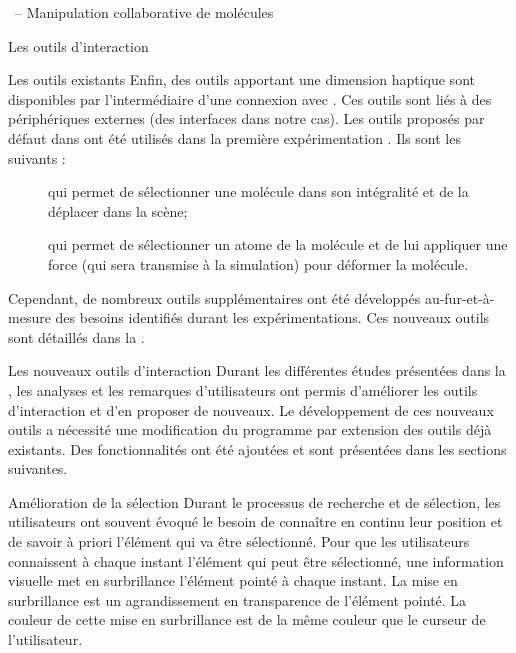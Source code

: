 \documentclass[myfrancais]{mythesis}
\begin{document}
\begin{mychapter}{\myShaddock\ -- Manipulation collaborative de molécules}
\begin{mysection}{Les outils d'interaction}
\begin{mysubsection}{Les outils existants}
				Enfin, des outils apportant une dimension haptique sont disponibles par l'intermédiaire d'une connexion avec  .
				Ces outils sont liés à des périphériques externes (des interfaces \myOmni dans notre cas).
				Les outils proposés par défaut dans  ont été utilisés dans la première expérimentation .
				Ils sont les suivants :
				\begin{description}
					\item[] qui permet de sélectionner une molécule dans son intégralité et de la déplacer dans la scène;
					\item[] qui permet de sélectionner un atome de la molécule et de lui appliquer une force (qui sera transmise à la simulation) pour déformer la molécule.
				\end{description}

				Cependant, de nombreux outils supplémentaires ont été développés au-fur-et-à-mesure des besoins identifiés durant les expérimentations.
				Ces nouveaux outils sont détaillés dans la .
			\end{mysubsection}
			\begin{mysubsection}{Les nouveaux outils d'interaction}
				Durant les différentes études présentées dans la , les analyses et les remarques d'utilisateurs ont permis d'améliorer les outils d'interaction et d'en proposer de nouveaux.
				Le développement de ces nouveaux outils a nécessité une modification du programme  par extension des outils déjà existants.
				Des fonctionnalités ont été ajoutées et sont présentées dans les sections suivantes.
				\begin{mysubsubsection}{Amélioration de la sélection}
					Durant le processus de recherche et de sélection, les utilisateurs ont souvent évoqué le besoin de connaître en continu leur position et de savoir à priori l'élément qui va être sélectionné.
					Pour que les utilisateurs connaissent à chaque instant l'élément qui peut être sélectionné, une information visuelle met en surbrillance l'élément pointé à chaque instant.
					La mise en surbrillance est un agrandissement en transparence de l'élément pointé.
					La couleur de cette mise en surbrillance est de la même couleur que le curseur de l'utilisateur.


\end{mysubsubsection}
\end{mysubsection}
\end{mysection}
\end{mychapter}
\end{document}
